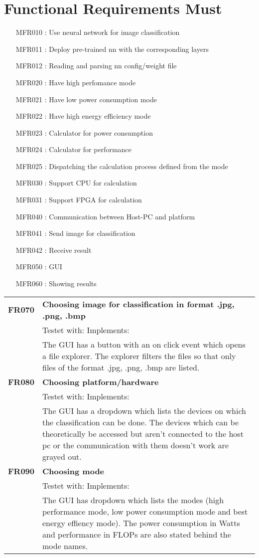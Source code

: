 \documentclass[parskip=full]{scrartcl}
\begin{document}
\section{Functional Requirements Must}
\begin{itemize}[nosep]
\item [MFR010]: Use neural network for image classification
\item [MFR011]: Deploy pre-trained nn with the corresponding layers
\item [MFR012]: Reading and parsing nn config/weight file
\item [MFR020]: Have high perfomance mode
\item [MFR021]: Have low power consumption mode
\item [MFR022]: Have high energy efficiency mode
\item [MFR023]: Calculator for power consumption
\item [MFR024]: Calculator for performance
\item [MFR025]: Dispatching the calculation process defined from the mode
\item [MFR030]: Support CPU for calculation
\item [MFR031]: Support FPGA for calculation
\item [MFR040]: Communication between Host-PC and platform
\item [MFR041]: Send image for classification
\item [MFR042]: Receive result
\item [MFR050]: GUI
\item [MFR060]: Showing results
\end{itemize}
\begin{tabular}{p{2cm}p{12cm}}
\textbf{FR070} & \textbf{Choosing image for classification in format .jpg, .png, .bmp}\\
& Testet with: Implements: \\
& The GUI has a button with an on click event which opens a file explorer. The explorer filters the files so that only files of the format .jpg, .png, .bmp are listed.\\
\textbf{FR080} & \textbf{Choosing platform/hardware}\\
& Testet with: Implements: \\
& The GUI has a dropdown which lists the devices on which the classification can be done. The devices which can be theoretically be accessed but aren't connected to the host pc or the communication with them doesn't work are grayed out. \\
\textbf{FR090} & \textbf{Choosing mode}\\
& Testet with: Implements: \\
& The GUI has dropdown which lists the modes (high performance mode, low power consumption mode and best energy effiency mode). The power consumption in Watts and performance in FLOPs are also stated behind the mode names.
\end{tabular}
\end{document}
